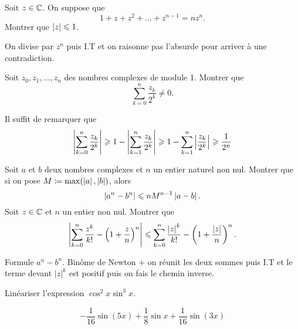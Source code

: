 \documentclass{magnolia}
\begin{document}
Soit $z\in\mathbb{C}$. On suppose que
\[1+z+z^2+\dots+z^{n-1}=nz^n.\]
Montrer que $\left|z\right|\leqslant 1$.
\begin{sol}
On divise par $z^n$ puis I.T et on raisonne pas l'absurde pour arriver à une contradiction.
\end{sol}

Soit $z_0,z_1,\ldots,z_n$ des nombres complexes de module 1. Montrer que
  \[\sum_{k=0}^n \frac{z_k}{2^k}\neq 0.\]
\begin{sol}
Il suffit de remarquer que
\[\left|\sum_{k=0}^n \frac{z_k}{2^k}\right|\geqslant
  1-\left|\sum_{k=1}^n \frac{z_k}{2^k}\right|\geqslant 1-\sum_{k=1}^n \left|\frac{z_k}{2^k}\right| \geqslant \frac{1}{2^n}\]
\end{sol}


\begin{questions}
\question Soit $a$ et $b$ deux nombres complexes et $n$ un entier naturel
  non nul. Montrer que si on pose $M\coloneqq\max(\left|a\right|,\left|b\right|)$, alors
  $$\left|a^n-b^n\right|\leqslant nM^{n-1}\left|a-b\right|.$$
\question Soit $z\in\mathbb{C}$ et $n$ un entier non nul. Montrer que
  $$\left|\sum_{k=0}^n \frac{z^k}{k!} - \left(1+\frac{z}{n}\right)^n\right|\leqslant
    \sum_{k=0}^n \frac{\left|z\right|^k}{k!}-\left(1+\frac{\left|z\right|}{n}\right)^n.$$
\end{questions}

\begin{sol}
\begin{questions}
\question Formule $a^n-b^n$.
\question Binôme de Newton + on réunit les deux sommes puis I.T et le terme devant $|z|^k$ est positif puis on fais le chemin inverse.
\end{questions}
\end{sol}



Linéariser l'expression $\cos^2 x \sin^3 x$.
\begin{sol}
\[-\frac{1}{16}\sin(5x)+\frac{1}{8}\sin x+\frac{1}{16}\sin(3x)\]
\end{sol}
\end{document}
